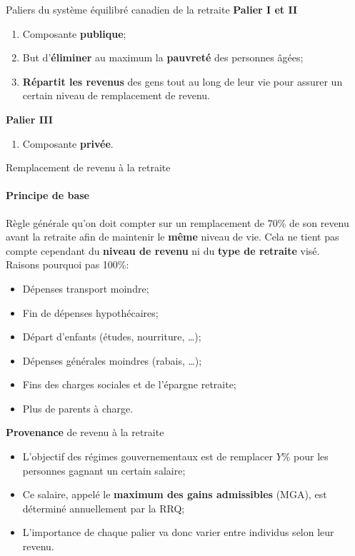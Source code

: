 \documentclass[10pt, french]{article}
\begin{document}
\begin{multicols*}{3}
\begin{conceptgen}{Paliers du système équilibré canadien de la retraite}
\textbf{Palier I et II}
\begin{enumerate}[leftmargin = *]
	\item	Composante \textbf{publique};
	\item	But d'\textbf{éliminer} au maximum la \textbf{pauvreté} des personnes âgées;
	\item	\textbf{Répartit les revenus} des gens tout au long de leur vie pour assurer un certain niveau de remplacement de revenu.
\end{enumerate}

\textbf{Palier III}
\begin{enumerate}[leftmargin = *]
	\item	Composante \textbf{privée}.
\end{enumerate}
\end{conceptgen}

\begin{conceptgen}{Remplacement de revenu à la retraite}
\paragraph{Principe de base}Règle générale qu'on doit compter sur un remplacement de 70\% de son revenu avant la retraite afin de maintenir le \textbf{même} niveau de vie. Cela ne tient pas compte cependant du \textbf{niveau de revenu} ni du \textbf{type de retraite} visé.
\\

Raisons pourquoi pas 100\%:
\begin{itemize}[leftmargin = *]
	\item	Dépenses transport moindre;
	\item	Fin de dépenses hypothécaires;
	\item	Départ d'enfants (études, nourriture, \dots);
	\item	Dépenses générales moindres (rabais, \dots);
	\item	Fins des charges sociales et de l'épargne retraite;
	\item	Plus de parents à charge.
\end{itemize}
\tcbline
\textbf{Provenance} de revenu à la retraite
\begin{itemize}[leftmargin = *]
	\item	L'objectif des régimes gouvernementaux est de remplacer $Y\%$ pour les personnes gagnant un certain salaire;
	\item	Ce salaire, appelé le \textbf{maximum des gains admissibles} (MGA), est déterminé annuellement par la RRQ;
	\item	L'importance de chaque palier va donc varier entre individus selon leur revenu.
\end{itemize}
\end{conceptgen}


\end{multicols*}
\end{document}
